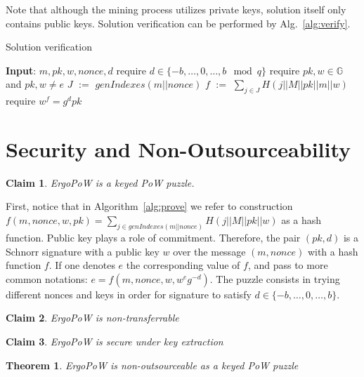 \documentclass[]{article}
\def\Let#1#2{\State #1 $:=$ #2}
\newtheorem{theorem}{Theorem}
\newtheorem{claim}{Claim}
\begin{document}
    Note that although the mining process utilizes private keys, solution itself
    only contains public keys. Solution verification can be performed by Alg.~\ref{alg:verify}.

    \begin{algorithm}[H]
        \caption{Solution verification}
        \label{alg:verify}
        \begin{algorithmic}[1]
            \State \textbf{Input}: $m,pk,w,nonce,d$
            \State require $d\in\{-b,\dots,0,\dots, b\mod q\}$
            \State require $pk,w\in \mathbb{G}$ and $pk,w \ne e$
            \Let{$J$}{$genIndexes(m||nonce)$}
            \Let{$f$}{$\sum_{j \in J} H(j||M||pk||m||w)$}
            \State require $w^f = g^dpk$
        \end{algorithmic}
    \end{algorithm}

    \section{Security and Non-Outsourceability}
    \begin{claim}
        ErgoPoW is a keyed PoW puzzle.
    \end{claim}
    First, notice that in Algorithm~\ref{alg:prove} we refer to construction
    $f(m,nonce,w,pk)=\sum_{j\in genIndexes(m||nonce)} H(j||M||pk||w)$ as a hash
    function. Public key plays a role of commitment. Therefore, the pair
    $(pk,d)$ is a Schnorr signature with a public key $w$ over the message
    $(m,nonce)$ with a hash function $f$. If one denotes $e$ the corresponding
    value of $f$, and pass to more common notations:
    $e=f(m,nonce,w,w^eg^{-d})$. The puzzle consists in trying
    different nonces and keys in order for signature to satisfy
    $d\in\{-b,\dots,0,\dots,b\}$. 
    \begin{claim}
        ErgoPoW is non-transferrable
    \end{claim}
    \begin{claim}
        ErgoPoW is secure under key extraction
    \end{claim}
    \begin{theorem}
        ErgoPoW is non-outsourceable as a keyed PoW puzzle
    \end{theorem}
\end{document}
